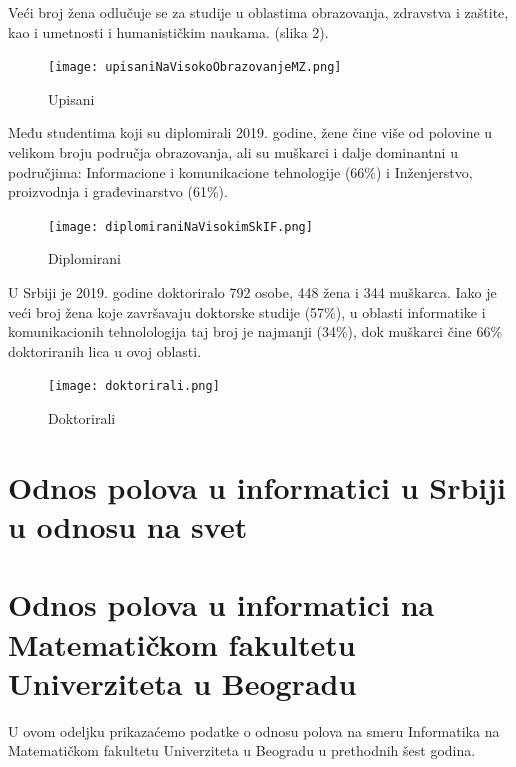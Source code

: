 \documentclass[a4paper]{article}
\begin{document}
Veći broj žena odlučuje se za studije u oblastima obrazovanja, zdravstva i zaštite, kao i umetnosti i humanističkim naukama. (slika 2). 
{
\centering
\begin{figure}[h!]
\begin{center}
\texttt{[image: upisaniNaVisokoObrazovanjeMZ.png]}
\end{center}
\caption{Upisani}
\label{fig:upisani}
\end{figure}
}
Među studentima koji su diplomirali 2019. godine, žene čine više od polovine u velikom broju područja obrazovanja, ali su muškarci i dalje dominantni u područjima: Informacione i komunikacione tehnologije (66\%) i Inženjerstvo, proizvodnja i građevinarstvo (61\%). \\

{
\centering
\begin{figure}[h!]
\begin{center}
\texttt{[image: diplomiraniNaVisokimSkIF.png]}
\end{center}
\caption{Diplomirani}
\label{fig:diplomirani}
\end{figure}
}


U Srbiji je 2019. godine doktoriralo 792 osobe, 448 žena i 344 muškarca. 
Iako je veći broj žena koje završavaju doktorske studije (57\%),  u oblasti informatike i komunikacionih tehnolologija taj broj je najmanji (34\%), dok muškarci čine 66\% doktoriranih lica u ovoj oblasti. \\


{
\centering
\begin{figure}[h!]
\begin{center}
\texttt{[image: doktorirali.png]}
\end{center}
\caption{Doktorirali}
\label{fig:doktorirali}
\end{figure}
}

\section{Odnos polova u informatici u Srbiji u odnosu na svet}	

\section{Odnos polova u informatici na Matematičkom fakultetu Univerziteta u Beogradu}
\label{matematicki}

U ovom odeljku prikazaćemo podatke o odnosu polova na smeru Informatika na Matematičkom fakultetu Univerziteta u Beogradu u prethodnih šest godina. \\
\end{document}
